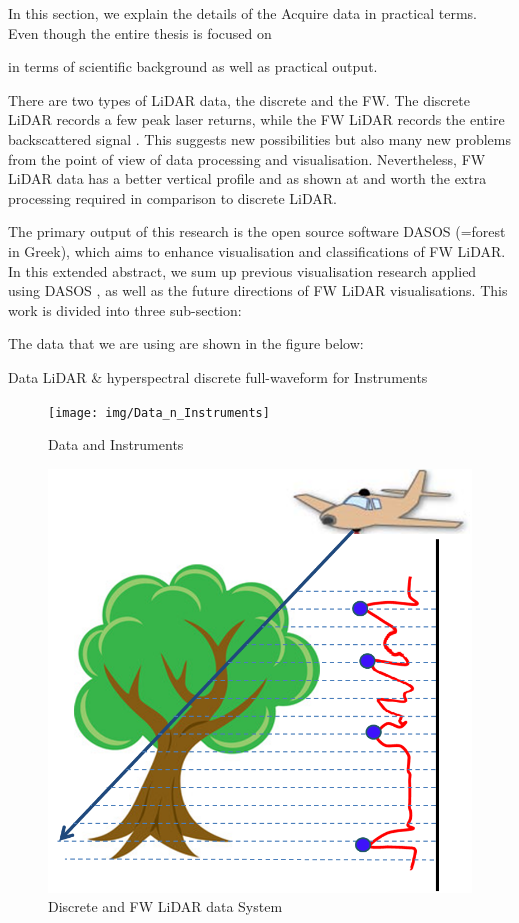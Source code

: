 \documentclass{subfiles}
\begin{document}
In this section, we explain the details of the Acquire data in practical terms. Even though the entire thesis is focused on

 in terms of scientific background as well as practical output. 

There are two types of LiDAR data, the discrete and the FW. The discrete LiDAR records a few peak laser returns, while the FW LiDAR records the entire backscattered signal \cite{Wanger2004}. This suggests new possibilities but also many new problems from the point of view of data processing and visualisation. Nevertheless, FW LiDAR data has a better vertical profile and as shown at \cite{Anderson2015} and worth the extra processing required in comparison to discrete LiDAR.
\par The primary output of this research is the open source software DASOS (=forest in Greek), which aims to enhance visualisation and classifications of FW LiDAR. In this extended abstract, we sum up previous visualisation research applied using DASOS \cite{Miltiadou2014} \cite{Miltiadou2015}, as well as the future directions of FW LiDAR visualisations. This work is divided into three sub-section:

The data that we are using are shown in the figure below:

Data
LiDAR \& hyperspectral
discrete full-waveform
for Instruments 


\begin{figure}
	\centering
	\texttt{[image: img/Data\_n\_Instruments]}
	\caption{Data and Instruments}
\end{figure}

\begin{figure}
	\centering
	\includegraphics[width=\textwidth/3*2]{img/LiDAR_DiscretVsFW_fig}
	\caption{Discrete and FW LiDAR data System}
\end{figure}
\end{document}
